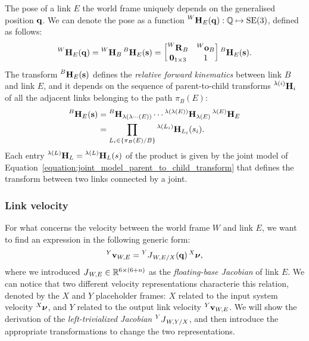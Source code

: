 The pose of a link $E$ \wrtl the world frame uniquely depends on the generalised position $\Qu$.
We can denote the pose as a function $\homo[W]_E(\Qu): \mathbb{Q} \mapsto \SE(3)$, defined as follows:
%
\begin{equation}
    \label{eq:multibody_kinematics_pose}
    \homo[W]_E(\Qu) = \homo[W]_B \homo[B]_E(\Shape) =
    \begin{bmatrix}
        \rot[W]_B & \ori[W]_B \\
        \zeros_{1\times 3} & 1
    \end{bmatrix}
    \homo[B]_E(\Shape)
    .
\end{equation}
%
The transform $\homo[B]_E(\Shape)$ defines the \emph{relative forward kinematics} between link $B$ and link $E$, and it depends on the sequence of parent-to-child transforms $\homo[\lambda(i)]_{i}$ of all the adjacent links belonging to the path $\pi_B(E)$:
%
\begin{align*}
    \homo[B]_E(\Shape) &= \homo[B]_{\lambda(\lambda\cdots(E))} \cdots \homo[\lambda(\lambda(E))]_{\lambda(E)} \homo[\lambda(E)]_E \\
    &= \prod_{L_i \in \{\pi_B(E)/B\}} \homo[\lambda(L_i)]_{L_i}(s_i)
    .
\end{align*}
%
Each entry $\homo[\lambda(L)]_L = \homo[\lambda(L)]_L(\shape)$ of the product is given by the joint model of Equation~\eqref{equation:joint_model_parent_to_child_transform} that defines the transform between two links connected by a joint.

\subsubsection{Link velocity}

For what concerns the velocity between the world frame $W$ and link $E$, we want to find an expression in the following generic form:
%
\begin{equation*}
    \velsix[Y]_{W,E} = \jac[Y]_{W,E/X}(\Qu) \Nu[X]
    ,
\end{equation*}
%
where we introduced $\jac_{W,E} \in \realn^{6\times(6+n)}$ as the \emph{floating-base Jacobian} of link $E$.
We can notice that two different velocity representations characterie this relation, denoted by the $X$ and $Y$ placeholder frames: $X$ related to the input system velocity $\Nu[X]$, and $Y$ related to the output link velocity $\velsix[Y]_{W,E}$.
We will show the derivation of the \emph{left-trivialized Jacobian} $\jac[Y]_{W,Y/X}$, and then introduce the appropriate transformations to change the two representations.

